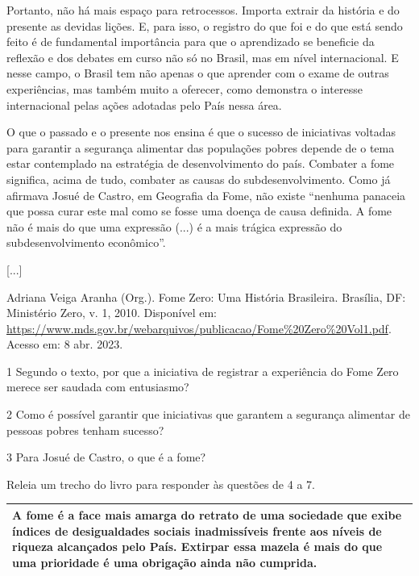 {\begin{itemize}
Portanto, não há mais espaço para retrocessos. Importa extrair da
história e do presente as devidas lições. E, para isso, o registro do
que foi e do que está sendo feito é de fundamental importância para que
o aprendizado se beneficie da reflexão e dos debates em curso não só no
Brasil, mas em nível internacional. E nesse campo, o Brasil tem não
apenas o que aprender com o exame de outras experiências, mas também
muito a oferecer, como demonstra o interesse internacional pelas ações
adotadas pelo País nessa área.

O que o passado e o presente nos ensina é que o sucesso de iniciativas
voltadas para garantir a segurança alimentar das populações pobres
depende de o tema estar contemplado na estratégia de desenvolvimento do
país. Combater a fome significa, acima de tudo, combater as causas do
subdesenvolvimento. Como já afirmava Josué de Castro, em Geografia da
Fome, não existe ``nenhuma panaceia que possa curar este mal como se
fosse uma doença de causa definida. A fome não é mais do que uma
expressão (...) é a mais trágica expressão do subdesenvolvimento
econômico''.

{[}...{]}

Adriana Veiga Aranha (Org.). Fome Zero: Uma História Brasileira.
Brasília, DF: Ministério Zero, v. 1, 2010. Disponível em:
\url{https://www.mds.gov.br/webarquivos/publicacao/Fome\%20Zero\%20Vol1.pdf}.
Acesso em: 8 abr. 2023.

\num{1} Segundo o texto, por que a iniciativa de registrar a experiência
do Fome Zero merece ser saudada com entusiasmo? 

\num{2} Como é possível garantir que iniciativas que garantem a
segurança alimentar de pessoas pobres tenham sucesso? 

\num{3} Para Josué de Castro, o que é a fome? 

Releia um trecho do livro para responder às questões de 4 a 7.

\begin{longtable}[]{@{}l@{}}
\toprule
A fome é a face mais amarga do retrato de uma sociedade que exibe
índices de desigualdades sociais inadmissíveis frente aos níveis de
riqueza alcançados pelo País. Extirpar essa mazela é mais do que uma
prioridade é uma obrigação ainda não cumprida.\tabularnewline
\bottomrule
\end{longtable}


\end{itemize}}
